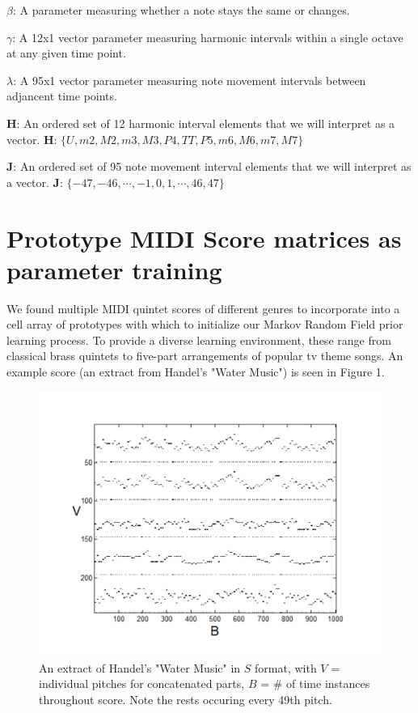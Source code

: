 \documentclass{article}
\begin{document}
$\beta$: A parameter measuring whether a note stays the same or changes.

$\gamma$: A 12x1 vector parameter measuring harmonic intervals within a single octave at any given time point.

$\lambda$: A 95x1 vector parameter measuring note movement intervals between adjancent time points.

{\bf H}: An ordered set of 12 harmonic interval elements that we will interpret as a vector.  {\bf H}: $\{U, m2, M2, m3, M3, P4, TT, P5, m6, M6, m7, M7\}$

{\bf J}: An ordered set of 95 note movement interval elements that we will interpret as a vector.  {\bf J}: $\{-47, -46, \cdots, -1, 0, 1, \cdots, 46, 47\}$


\section{Prototype MIDI Score matrices as parameter training}

We found multiple MIDI quintet scores of different genres to incorporate into a cell array of prototypes with which to initialize our Markov Random Field prior learning process.  To provide a diverse learning environment, these range from classical brass quintets to five-part arrangements of popular tv theme songs.  An example score (an extract from Handel's "Water Music") is seen in Figure 1.

\begin{figure}
\centering
\includegraphics[width=.9\textwidth]{figures/handel(extract).pdf}
\caption{An extract of Handel's "Water Music" in $S$ format, with $V$ = individual pitches for concatenated parts, $B$ = \# of time instances throughout score.  Note the rests occuring every 49th pitch.}
\label{fig-1}
\end{figure}
\end{document}
